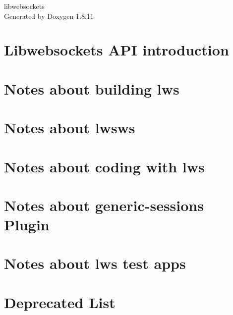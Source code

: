 \documentclass[twoside]{book}
\newcommand{\+}{\discretionary{\mbox{\scriptsize$\hookleftarrow$}}{}{}}
\newcommand{\clearemptydoublepage}{%
  \newpage{\pagestyle{empty}\cleardoublepage}%
}
\begin{document}
\hypersetup{pageanchor=false,
             bookmarksnumbered=true,
             pdfencoding=unicode
            }
\begin{titlepage}
\vspace*{7cm}
\begin{center}%
{\Large libwebsockets }\\
\vspace*{1cm}
{\large Generated by Doxygen 1.8.11}\\
\end{center}
\end{titlepage}
\clearemptydoublepage
\tableofcontents
\clearemptydoublepage
{}
\hypersetup{pageanchor=true}

\chapter{Libwebsockets A\+PI introduction}
\label{index}\hypertarget{index}{}
\chapter{Notes about building lws}
\label{md_README.build}
\hypertarget{md_README.build}{}

\chapter{Notes about lwsws}
\label{md_README.lwsws}
\hypertarget{md_README.lwsws}{}

\chapter{Notes about coding with lws}
\label{md_README.coding}
\hypertarget{md_README.coding}{}

\chapter{Notes about generic-\/sessions Plugin}
\label{md_README.generic-sessions}
\hypertarget{md_README.generic-sessions}{}

\chapter{Notes about lws test apps}
\label{md_README.test-apps}
\hypertarget{md_README.test-apps}{}

\chapter{Deprecated List}
\label{deprecated}
\hypertarget{deprecated}{}

\end{document}
